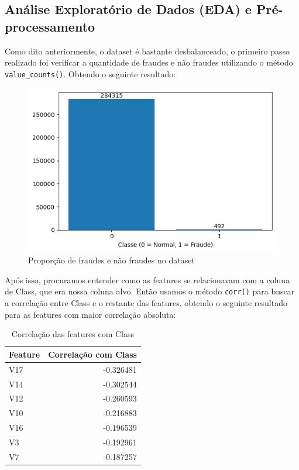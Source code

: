 \documentclass[conference]{IEEEtran}
\begin{document}
\subsection{Análise Exploratório de Dados (EDA) e Pré-processamento}
\label{subsec:eda}
  Como dito anteriormente, o dataset é bastante desbalanceado, o primeiro passo realizado foi verificar a quantidade de fraudes e não fraudes utilizando o método \texttt{value\_counts()}. Obtendo o seguinte resultado:
  \begin{figure}[H]
    \centerline{\includegraphics[width=0.8\linewidth]{../output/proporcao_dados.png}}
    \caption{Proporção de fraudes e não fraudes no dataset}
    \label{fig:proporcao_dados}
  \end{figure}
  Após isso, procuramos entender como as features se relacionavam com a coluna de Class, que era nossa coluna alvo. Então usamos o método \texttt{corr()} para buscar a correlação entre Class e o restante das features. obtendo o seguinte resultado para as features com maior correlação absoluta:
  \begin{table}[tb]
      \caption{Correlação das features com Class}
      \label{tab:correlacao_features}
      \centering
      \begin{tabular}{lr}
          \toprule
          \textbf{Feature} & \textbf{Correlação com Class} \\
          \midrule
          V17    & -0.326481 \\
          V14    & -0.302544 \\
          V12    & -0.260593 \\
          V10    & -0.216883 \\
          V16    & -0.196539 \\
          V3     & -0.192961 \\
          V7     & -0.187257 \\
          \bottomrule
      \end{tabular}
  \end{table}
\end{document}
